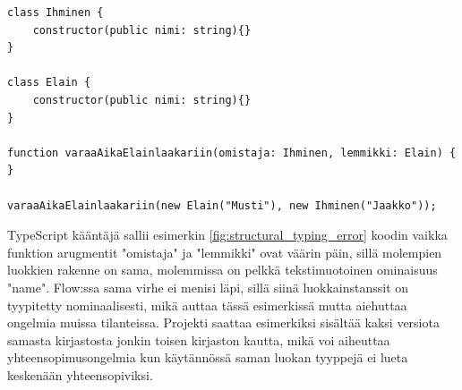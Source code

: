 \begin{minipage}{\linewidth}
\begin{lstlisting}[caption={Loogisen virheen sisältävä, mutta ilman virheitä kääntyvä TypeScript-ohjelma.}]
class Ihminen {
    constructor(public nimi: string){}
}

class Elain {
    constructor(public nimi: string){}
}

function varaaAikaElainlaakariin(omistaja: Ihminen, lemmikki: Elain) { }

varaaAikaElainlaakariin(new Elain("Musti"), new Ihminen("Jaakko"));
\end{lstlisting}
\label{fig:structural_typing_error}
\end{minipage}

TypeScript kääntäjä sallii esimerkin \ref{fig:structural_typing_error} koodin
vaikka funktion arugmentit "omistaja" ja "lemmikki" ovat väärin päin, sillä
molempien luokkien rakenne on sama, molemmissa on pelkkä tekstimuotoinen
ominaisuus "name". Flow:ssa sama virhe ei menisi läpi, sillä siinä luokkainstanssit
on tyypitetty nominaalisesti, mikä auttaa tässä esimerkissä mutta aiehuttaa ongelmia
muissa tilanteissa. Projekti saattaa esimerkiksi sisältää kaksi versiota samasta
kirjastosta jonkin toisen kirjaston kautta, mikä voi aiheuttaa yhteensopimusongelmia
kun käytännössä saman luokan tyyppejä ei lueta keskenään yhteensopiviksi. 